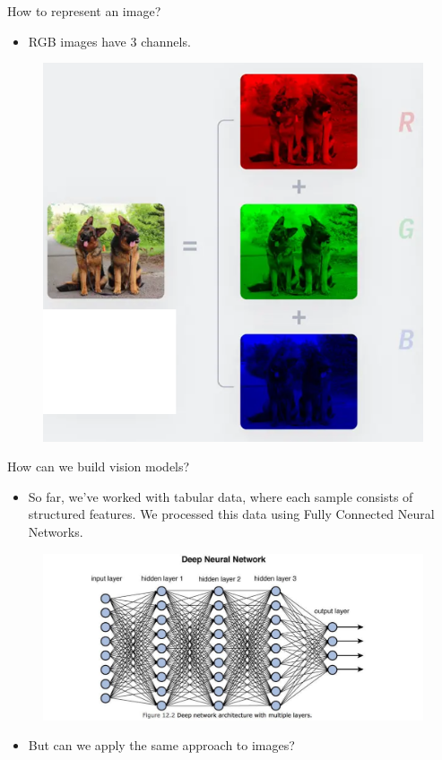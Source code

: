 \documentclass[10pt]{beamer}
\theoremstyle{remark}
\theoremstyle{definition}
\begin{document}
\begin{frame}{How to represent an image?}
\begin{itemize}

    \item RGB images have 3 channels.
\end{itemize}
\begin{figure}
\centering
\includegraphics[width=1.5\textwidth,height=0.7\textheight,keepaspectratio]{./images/RGB.png}
\end{figure}
\end{frame}

\begin{frame}{How can we build vision models?}
\begin{itemize}
    \item So far, we’ve worked with tabular data, where each sample consists of structured features. We processed this data using Fully Connected Neural Networks.

\end{itemize}
\begin{figure}
\centering
\includegraphics[width=1.0\textwidth,height=1.0\textheight,keepaspectratio]{./images/nn.jpg}
\end{figure}
\begin{itemize}
    \item But can we apply the same approach to images?
\end{itemize}

\end{frame}
\end{document}

